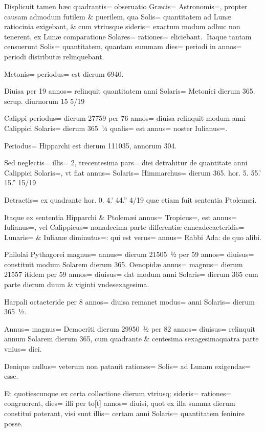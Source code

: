 \begin{parnumbers}

Displicuit tamen hæc quadrantis= obseruatio Græcis= Astronomis=, propter causam admodum futilem  \& puerilem, qua Solis= quantitatem ad Lunæ ratiocinia exigebant, \& cum vtriusque sideris= exactum modum adhuc non tenerent, ex Lunæ comparatione Solares= rationes= eliciebant.
Itaque tantam censuerunt Solis= quantitatem, quantam summam dies= periodi in annos= periodi distributæ relinquebant.

Metonis= periodus= est dierum 6940.

Diuisa per 19 annos= relinquit quantitatem anni Solaris= Metonici dierum 365. scrup. diurnorum 15 5/19

Calippi periodus= dierum 27759 per 76 annos= diuisa relinquit modum anni Calippici Solaris= dierum 365 ¼ qualis= est annus= noster Iulianus=.

Periodus= Hipparchi est dierum 111035, annorum 304.

Sed neglectis= illis= 2, trecentesima pars= diei detrahitur de quantitate anni Calippici Solaris=,  vt fiat annus= Solaris= Himmarchus= dierum 365. hor. 5. 55.' 15.'' 15/19

Detractis= ex quadrante hor. 0. 4.' 44.'' 4/19 quæ etiam fuit sententia Ptolemæi.

Itaque ex sententia Hipparchi \& Ptolemæi annus= Tropicus=, est annus= Iulianus=, vel Calippicus= nonadecima parte differentiæ enneadecaeteridis= Lunaris= \& Iulianæ diminutus=: qui est verus= annus= Rabbi Ada: de quo alibi.

Philolai Pythagorei magnus= annus= dierum 21505 ½ per 59 annos= diuisus= constituit modum Solarem dierum 365. Oenopidæ annus= magnus= dierum 21557 itidem per 59 annos= diuisus= dat modum anni Solaris= dierum 365 cum parte dierum duum \& viginti vndesexagesima.

Harpali octaeteride per 8 annos= diuisa remanet modus= anni Solaris= dierum 365 ½.

Annus= magnus=  Democriti dierum 29950 ½ per 82 annos= diuisus= relinquit annum Solarem dierum 365, cum quadrante \& centesima sexagesimaquatra parte vnius= diei.

Denique nullus= veterum non patauit rationes= Solis= ad Lunam exigendas= esse.

Et quotiescunque ex certa collectione dierum vtriusq; sideris= rationes= congruerent, dies= illi per to[t] annos= diuisi, quot ex illa summa dierum constitui poterant, visi sunt illis= certam anni Solaris= quantitatem feninire posse.


\end{parnumbers}
